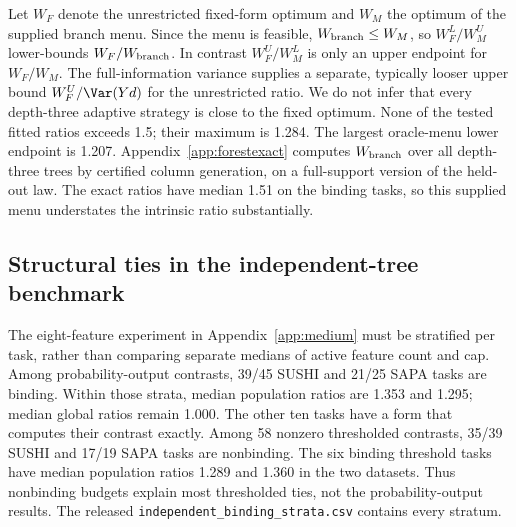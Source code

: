 Let $W_F$ denote the unrestricted fixed-form optimum and $W_M$ the optimum
of the supplied branch menu. Since the menu is feasible,
$W_{\rm branch}\le W_M$, so $W_F^L/W_M^U$ lower-bounds
$W_F/W_{\rm branch}$. In contrast $W_F^U/W_M^L$ is only an upper endpoint
for $W_F/W_M$. The full-information variance supplies a separate, typically
looser upper bound $W_F^U/\Var(Yd)$ for the unrestricted ratio. We do not
infer that every depth-three adaptive strategy is close to the fixed
optimum. None of the tested fitted ratios exceeds 1.5; their maximum is
1.284. The largest oracle-menu lower endpoint is 1.207.
Appendix~\ref{app:forestexact} computes $W_{\rm branch}$ over all
depth-three trees by certified column generation, on a full-support version
of the held-out law. The exact ratios have median 1.51 on the binding tasks,
so this supplied menu understates the intrinsic ratio substantially.



\subsection{Structural ties in the independent-tree benchmark}\label{app:binding}
The eight-feature experiment in Appendix~\ref{app:medium} must be stratified
per task, rather than comparing separate medians of active feature count
and cap. Among probability-output contrasts, 39/45 SUSHI and 21/25 SAPA
tasks are binding. Within those strata, median population ratios are
1.353 and 1.295; median global ratios remain 1.000. The other ten tasks
have a form that computes their contrast exactly. Among 58 nonzero
thresholded contrasts, 35/39 SUSHI and 17/19 SAPA tasks are nonbinding.
The six binding threshold tasks have median population ratios 1.289 and
1.360 in the two datasets. Thus nonbinding budgets explain most
thresholded ties, not the probability-output results. The released
\texttt{independent\_binding\_strata.csv} contains every stratum.

